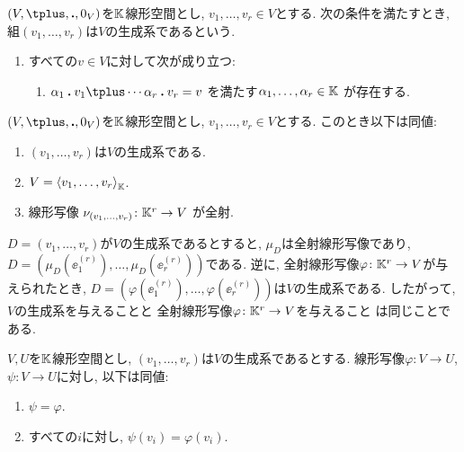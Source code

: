 \begin{definition}
  $(V,\plus,\act,0_V)$を$\mathbb{K}$線形空間とし,
  $v_1,\ldots,v_r\in V$とする.
  次の条件を満たすとき,
  組$(v_1,\ldots,v_r)$は$V$の生成系であるという.
  \begin{enumerate}
  \item
    すべての$v\in V$に対して次が成り立つ:
    \begin{enumerate}
    \item
    $\alpha_1\act v_1\plus \cdots \alpha_r\act v_r=v$
    を満たす$\alpha_1,\ldots,\alpha_r\in\mathbb{K}$ が存在する.
    \end{enumerate}
  \end{enumerate}
\end{definition}
\begin{prop}
  $(V,\plus,\act,0_V)$を$\mathbb{K}$線形空間とし,
  $v_1,\ldots,v_r\in V$とする.
  このとき以下は同値:
  \begin{enumerate}
  \item $(v_1,\ldots,v_r)$は$V$の生成系である.
  \item $V=\Braket{v_1,\ldots,v_r}_{\mathbb{K}}$.
  \item 線形写像 $\nu_{(v_1,\ldots,v_r)}\colon \mathbb{K}^r \to V$
    が全射.
  \end{enumerate}
\end{prop}
\begin{remark}
  $D=(v_1,\ldots,v_r)$が$V$の生成系であるとすると,
  $\mu_D$は全射線形写像であり,
  $D=(\mu_D(\ee^{(r)}_1),\ldots,\mu_D(\ee^{(r)}_r))$である.
  逆に, 全射線形写像$\varphi\colon \mathbb{K}^r\to V$が与えられたとき,
  $D=(\varphi(\ee^{(r)}_1),\ldots,\varphi(\ee^{(r)}_r))$は$V$の生成系である.
  したがって,
  $V$の生成系を与えることと
  全射線形写像$\varphi\colon \mathbb{K}^r\to V$を与えること
  は同じことである.
\end{remark}

\begin{prop}
  $V, U$を$\mathbb{K}$線形空間とし,
  $(v_1,\ldots,v_r)$は$V$の生成系であるとする.
  線形写像$\varphi\colon V\to U$,
  $\psi\colon V\to U$に対し,
  以下は同値:
  \begin{enumerate}
  \item $\psi=\varphi$.
  \item すべての$i$に対し,  $\psi(v_i)=\varphi(v_i)$.
  \end{enumerate}
\end{prop}



